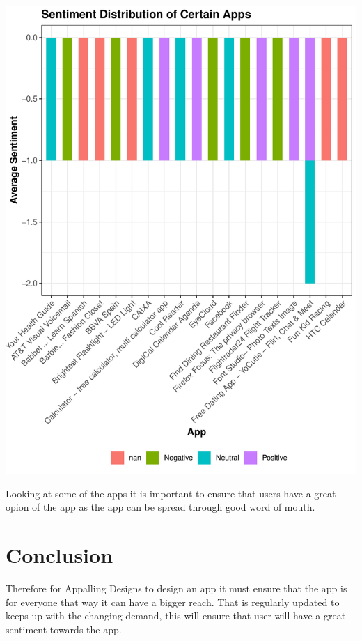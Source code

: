 \documentclass[11pt,preprint, authoryear]{elsarticle}
\let\origfigure\figure
\let\endorigfigure\endfigure
\renewenvironment{figure}[1][2] {
    \expandafter\origfigure\expandafter[H]
} {
    \endorigfigure
}
\numberwithin{equation}{section}
\numberwithin{figure}{section}
\numberwithin{table}{section}
\begin{document}
\begin{figure}[H]

{\centering \includegraphics{Q5_files/figure-latex/Figure6-1} 

}

\caption{App Sentiment   \label{Figure6}}\label{fig:Figure6}
\end{figure}

Looking at some of the apps it is important to ensure that users have a
great opion of the app as the app can be spread through good word of
mouth.

\hypertarget{section}{%
\section{}\label{section}}

\hypertarget{conclusion}{%
\section{Conclusion}\label{conclusion}}

Therefore for Appalling Designs to design an app it must ensure that the
app is for everyone that way it can have a bigger reach. That is
regularly updated to keeps up with the changing demand, this will ensure
that user will have a great sentiment towards the app.


\end{document}
